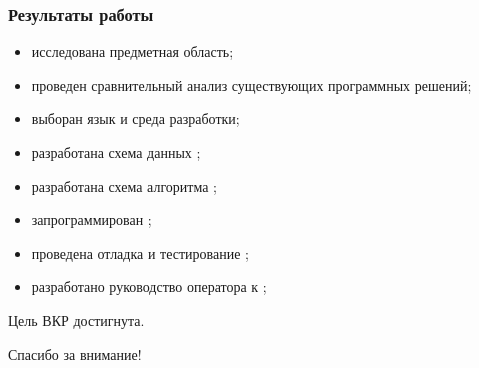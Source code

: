 \begin{frame}%
\frametitle{Результаты работы}
    \begin{itemize}
        \item исследована предметная область;
        \item проведен сравнительный анализ существующих программных решений;
        \item выборан язык и среда разработки;
        \item разработана схема данных {\ProgModule};
        \item разработана схема алгоритма {\ProgModule};
        \item запрограммирован {\ProgModule};
        \item проведена отладка и тестирование {\ProgModule};
        \item разработано руководство оператора к {\ProgModule};
    \end{itemize}
    Цель ВКР достигнута.
\end{frame}

\begin{frame}%

    \begin{center}
        \Huge Спасибо за внимание!
    \end{center}
    
\end{frame}
